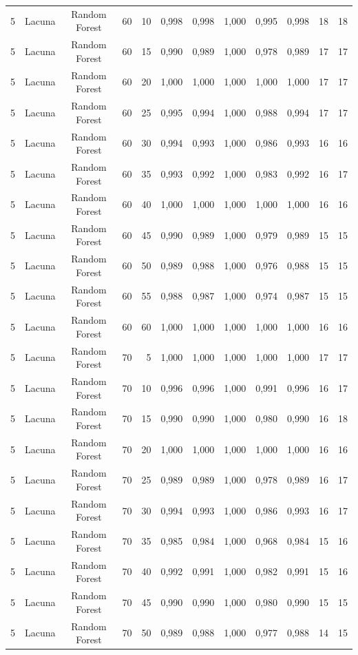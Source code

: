 \begin{longtable}{ccclrrrrrrrr}
5 & Lacuna & Random Forest & 60 & 10 & 0,998 & 0,998 & 1,000 & 0,995 & 0,998 & 18 & 18 \\
5 & Lacuna & Random Forest & 60 & 15 & 0,990 & 0,989 & 1,000 & 0,978 & 0,989 & 17 & 17 \\
5 & Lacuna & Random Forest & 60 & 20 & 1,000 & 1,000 & 1,000 & 1,000 & 1,000 & 17 & 17 \\
5 & Lacuna & Random Forest & 60 & 25 & 0,995 & 0,994 & 1,000 & 0,988 & 0,994 & 17 & 17 \\
5 & Lacuna & Random Forest & 60 & 30 & 0,994 & 0,993 & 1,000 & 0,986 & 0,993 & 16 & 16 \\
5 & Lacuna & Random Forest & 60 & 35 & 0,993 & 0,992 & 1,000 & 0,983 & 0,992 & 16 & 17 \\
5 & Lacuna & Random Forest & 60 & 40 & 1,000 & 1,000 & 1,000 & 1,000 & 1,000 & 16 & 16 \\
5 & Lacuna & Random Forest & 60 & 45 & 0,990 & 0,989 & 1,000 & 0,979 & 0,989 & 15 & 15 \\
5 & Lacuna & Random Forest & 60 & 50 & 0,989 & 0,988 & 1,000 & 0,976 & 0,988 & 15 & 15 \\
5 & Lacuna & Random Forest & 60 & 55 & 0,988 & 0,987 & 1,000 & 0,974 & 0,987 & 15 & 15 \\
5 & Lacuna & Random Forest & 60 & 60 & 1,000 & 1,000 & 1,000 & 1,000 & 1,000 & 16 & 16 \\
5 & Lacuna & Random Forest & 70 & 5 & 1,000 & 1,000 & 1,000 & 1,000 & 1,000 & 17 & 17 \\
5 & Lacuna & Random Forest & 70 & 10 & 0,996 & 0,996 & 1,000 & 0,991 & 0,996 & 16 & 17 \\
5 & Lacuna & Random Forest & 70 & 15 & 0,990 & 0,990 & 1,000 & 0,980 & 0,990 & 16 & 18 \\
5 & Lacuna & Random Forest & 70 & 20 & 1,000 & 1,000 & 1,000 & 1,000 & 1,000 & 16 & 16 \\
5 & Lacuna & Random Forest & 70 & 25 & 0,989 & 0,989 & 1,000 & 0,978 & 0,989 & 16 & 17 \\
5 & Lacuna & Random Forest & 70 & 30 & 0,994 & 0,993 & 1,000 & 0,986 & 0,993 & 16 & 17 \\
5 & Lacuna & Random Forest & 70 & 35 & 0,985 & 0,984 & 1,000 & 0,968 & 0,984 & 15 & 16 \\
5 & Lacuna & Random Forest & 70 & 40 & 0,992 & 0,991 & 1,000 & 0,982 & 0,991 & 15 & 16 \\
5 & Lacuna & Random Forest & 70 & 45 & 0,990 & 0,990 & 1,000 & 0,980 & 0,990 & 15 & 15 \\
5 & Lacuna & Random Forest & 70 & 50 & 0,989 & 0,988 & 1,000 & 0,977 & 0,988 & 14 & 15 \\

\end{longtable}
